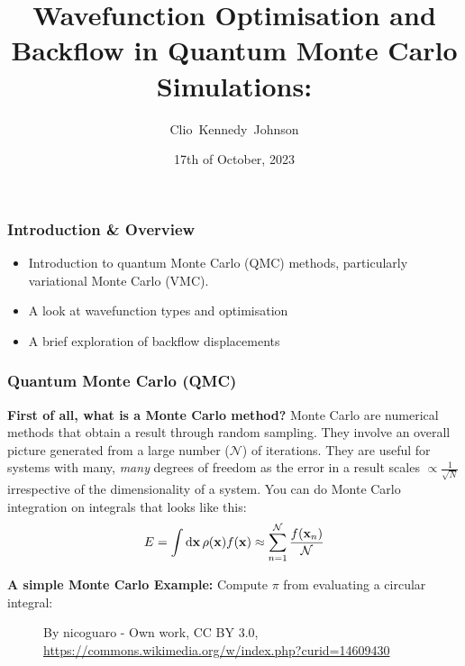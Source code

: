 \documentclass[10pt]{beamer}
\title[Optimisation and Backflow]{Wavefunction Optimisation and Backflow in Quantum Monte Carlo Simulations:}
\subtitle{}
\author[Clio Johnson]{Clio~Kennedy~Johnson}
\date[2023-10-17]{17th of October, 2023}
\begin{document}
\begin{frame}
    \titlepage%
\end{frame}


\begin{frame}
    \frametitle{Introduction \& Overview}
    \begin{itemize}
        \item[\textbullet] Introduction to quantum Monte Carlo (QMC) methods, particularly variational Monte Carlo (VMC).
        \item[\textbullet] A look at wavefunction types and optimisation
        \item[\textbullet] A brief exploration of backflow displacements
    \end{itemize}
\end{frame}


\begin{frame}[allowframebreaks]
    \frametitle{Quantum Monte Carlo (QMC)}
    \textbf{First of all, what is a Monte Carlo method?}\medskip\newline
    Monte Carlo are numerical methods that obtain a result through random sampling. They involve an overall picture generated from a large number ($\mathcal{N}$) of iterations.\medskip\newline
    They are useful for systems with many, \textit{many} degrees of freedom as the error in a result scales $\propto\frac{1}{\sqrt{N}}$ irrespective of the dimensionality of a system.\medskip\newline %
    You can do Monte Carlo integration on integrals that looks like this:
    \begin{equation}
        E = \int\dd{\vb{x}}\rho\pqty{\vb{x}}f\pqty{\vb{x}}
        \approx\sum_{n=1}^{\mathcal{N}}\frac{f\pqty{\vb{x}_n}}{\mathcal{N}}
    \end{equation}
    \framebreak%

    \textbf{A simple Monte Carlo Example:}\medskip\newline
    Compute $\pi$ from evaluating a circular integral:
    \begin{figure}
        \centering
        \caption{%
            By nicoguaro - Own work, CC BY 3.0,
            \url{https://commons.wikimedia.org/w/index.php?curid=14609430}
        }
    \end{figure}
    \framebreak%


\end{frame}
\end{document}
